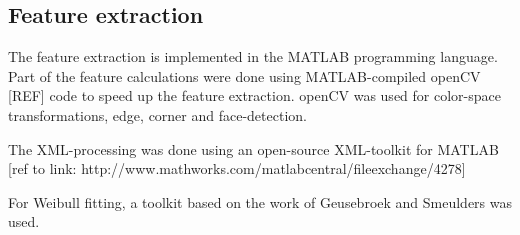 
\subsection{Feature extraction}
The feature extraction is implemented in the MATLAB programming language. Part of the feature calculations were done using MATLAB-compiled openCV [REF] code to speed up the feature extraction. openCV was used for color-space transformations, edge, corner and face-detection.

The XML-processing was done using an open-source XML-toolkit for MATLAB [ref to link: http://www.mathworks.com/matlabcentral/fileexchange/4278] 

For Weibull fitting, a toolkit based on the work of Geusebroek and Smeulders \cite{geusebroek2005six} was used. 


